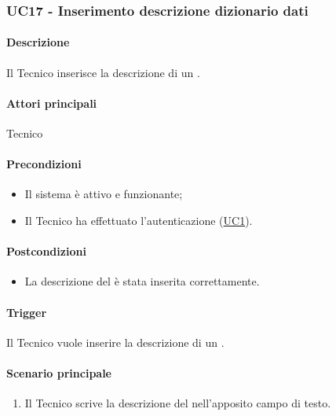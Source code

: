 \subsubsection{UC17 - Inserimento descrizione dizionario dati}\label{UC17}
\paragraph*{Descrizione}
Il Tecnico inserisce la descrizione di un .

\paragraph*{Attori principali}
Tecnico

\paragraph*{Precondizioni}
\begin{itemize}
  \item Il sistema è attivo e funzionante;
  \item Il Tecnico ha effettuato l'autenticazione (\hyperref[UC1]{UC1}).
\end{itemize}

\paragraph*{Postcondizioni}
\begin{itemize}
  \item La descrizione del  è stata inserita correttamente.
\end{itemize}

\paragraph*{Trigger}
Il Tecnico vuole inserire la descrizione di un .

\paragraph*{Scenario principale}
\begin{enumerate}
  \item Il Tecnico scrive la descrizione del  nell'apposito campo di testo.
\end{enumerate}